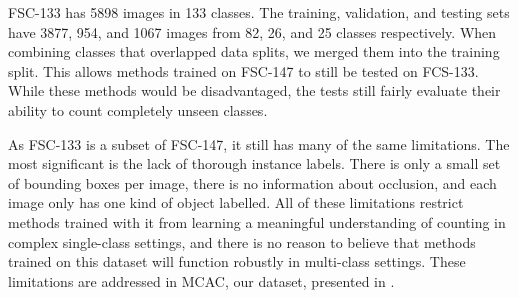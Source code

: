 \documentclass[../thesis.tex]{subfiles}
\begin{document}
FSC-133 has 5898 images in 133 classes. The training, validation, and testing sets have 3877, 954, and 1067 images from 82, 26, and 25 classes respectively.
When combining classes that overlapped data splits, we merged them into the training split. This allows methods trained on FSC-147 to still be tested on FCS-133. While these methods would be disadvantaged, the tests still fairly evaluate their ability to count completely unseen classes.

As FSC-133 is a subset of FSC-147, it still has many of the same limitations. The most significant is the lack of thorough instance labels. There is only a small set of bounding boxes per image, there is no information about occlusion, and each image only has one kind of object labelled. 
All of these limitations restrict methods trained with it from learning a meaningful understanding of counting in complex single-class settings, and there is no reason to believe that methods trained on this dataset will function robustly in multi-class settings.
These limitations are addressed in MCAC, our dataset, presented in .
\end{document}
